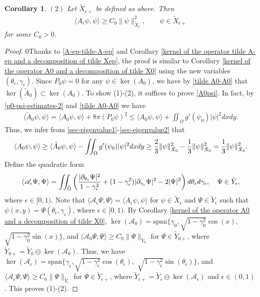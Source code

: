 \documentclass[1 [leqno, 11pt]{amsart}
\numberwithin{equation}{section}
\let\ep=\epsilon
\newtheorem{Corollary}[Theorem]{Corollary}
\begin{document}
\begin{CJK*}{GBK}{song}
\begin{Corollary}
$(2)$ Let $\tilde X_{\ep+}$ be defined as above. Then
\begin{align*}
\langle  A_\ep \psi,\psi\rangle \geq C_0 \| \psi\|_{\tilde X_\ep}^2, \quad \quad \psi\in \tilde X_{\ep+}
\end{align*}
for some $C_0>0$.
\end{Corollary}
\begin{proof}
\if0Thanks to \eqref{A-ep-tilde-A-ep} and Corollary \ref{kernel of  the operator tilde A-ep and a decomposition of tilde Xep}, the proof is similar to Corollary \ref{kernel of  the operator A0 and a decomposition of tilde X0} using the new variables $(\theta_\ep,\gamma_\ep)$.
\fi
{}
Since $P_0\psi=0$ for any $\psi\in\ker ( A_0)$, we have by \eqref{tilde A0-A0} that $\ker (\tilde A_0)\subset \ker ( A_0)$. To show (1)-(2), it suffices to prove \eqref{A0psi}. In fact, by \eqref{p0-psi-estimates-2} and \eqref{tilde A0-A0} we have
\begin{align*}
\langle\tilde  A_0 \psi,\psi\rangle=\langle A_0 \psi,\psi\rangle+8\pi(P_0 \psi)^2\leq\langle A_0 \psi,\psi\rangle+\iint_\Omega g'(\psi_0)|\psi|^2dxdy.
\end{align*}
Thus, we infer from \eqref{sec-eigenvalue1}-\eqref{sec-eigenvalue2} that
\begin{align*}
\langle A_0 \psi,\psi\rangle\geq
\langle\tilde  A_0 \psi,\psi\rangle-\iint_\Omega g'(\psi_0)|\psi|^2dxdy\geq {2\over3} \| \psi\|_{\tilde X_0}^2-{1\over3} \| \psi\|_{\tilde X_0}^2={1\over3} \| \psi\|_{\tilde X_0}^2.
\end{align*}
\fi
Define the quadratic form
 \begin{align*}
 \langle\mathscr{A}_\ep\Psi,\Psi\rangle=\iint_{\tilde\Omega}\left({|\partial_{\theta_\ep}\Psi|^2\over 1-\gamma_\ep^2}+(1-\gamma_\ep^2)|\partial_{\gamma_\ep}\Psi|^2-2|\Psi|^2\right)d\theta_\ep d\gamma_\ep,\quad \Psi\in\tilde{Y}_\ep,
 \end{align*}
 where $\ep\in[0,1)$. Note that $\langle\mathscr{A}_\ep\Psi,\Psi\rangle=\langle{A}_\ep\psi,\psi\rangle$ for   $\psi \in \tilde{X}_\ep$ and $\Psi \in \tilde{Y}_\ep$ such that $\psi(x,y) = \Psi(\theta_\ep, \gamma_\ep)$, where $\ep\in[0,1)$.
 By Corollary \ref{kernel of  the operator A0 and a decomposition of tilde X0}, $\ker(\mathscr{A}_0)=\text{span}\{\gamma_0,\sqrt{1-\gamma_0^2}\cos(x),$ $\sqrt{1-\gamma_0^2}\sin(x)\}$, and $\langle\mathscr{A}_0\Psi,\Psi\rangle\geq C_0\|\Psi\|_{\tilde Y_0}$ for $\Psi\in \tilde Y_{0+}$, where $\tilde Y_{0+}=\tilde Y_0 \ominus\ker (\mathscr{A}_0)$. Thus, we  have $\ker(\mathscr{A}_\ep)=\text{span}\{\gamma_\ep,\sqrt{1-\gamma_\ep^2}\cos(\theta_\ep),$ $\sqrt{1-\gamma_\ep^2}\sin(\theta_\ep)\}$, and $\langle\mathscr{A}_\ep\Psi,\Psi\rangle\geq C_0\|\Psi\|_{\tilde Y_\ep}$ for $\Psi\in \tilde Y_{\ep+}$, where $\tilde Y_{\ep+}=\tilde Y_{\ep} \ominus\ker (\mathscr{A}_{\ep})$ and $\ep\in(0,1)$. This proves (1)-(2).
\end{proof}


\end{CJK*}
\end{document}
